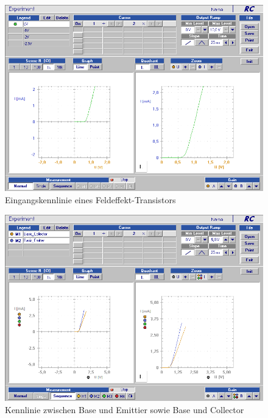 \documentclass[12pt,a4paper]{article}
\begin{document}
\begin{figure}[H]
	\centering
	\includegraphics[scale=0.5]{./data/Braun_Kurz_PS8/FET_Eingangskennlinie.png}
	\caption{Eingangskennlinie eines Feldeffekt-Transistors}
	\label{fig:eingangskennlinien_fet}
\end{figure}

\begin{figure}[H]
	\centering
	\includegraphics[scale=0.5]{./data/Braun_Kurz_PS8/Kennlinien_Emitter_Collector.png}
	\caption{Kennlinie zwischen Base und Emittier sowie Base und Collector}
	\label{fig:kenn_emit_coll}
\end{figure}
\end{document}
